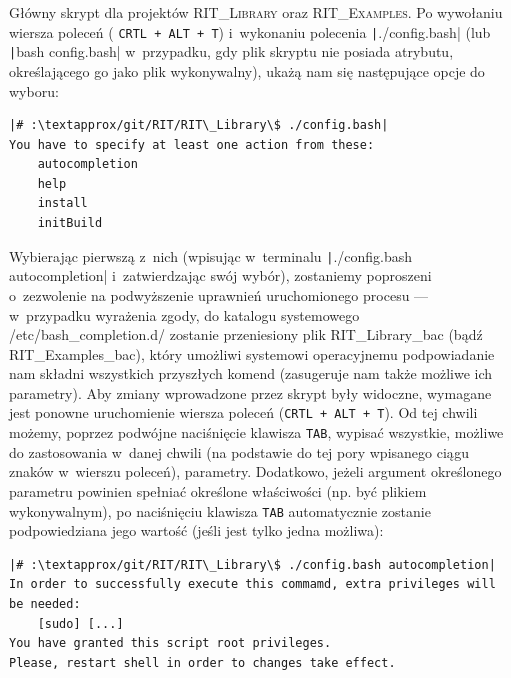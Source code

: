 
Główny skrypt dla projektów \textsc{RIT\_Library} oraz \textsc{RIT\_Examples}. Po wywołaniu wiersza poleceń ( \texttt{CRTL + ALT + T}) i~wykonaniu polecenia \texttt|./config.bash| (lub \texttt|bash config.bash| w~przypadku, gdy plik skryptu nie posiada atrybutu, określającego go jako plik wykonywalny), ukażą nam się następujące opcje do wyboru:

\begin{verbatim}
|# :\textapprox/git/RIT/RIT\_Library\$ ./config.bash|
You have to specify at least one action from these:
	autocompletion
	help
	install
	initBuild
\end{verbatim}

Wybierając pierwszą z~nich (wpisując w~terminalu \texttt|./config.bash autocompletion| i~zatwierdzając swój wybór), zostaniemy poproszeni o~zezwolenie na podwyższenie uprawnień uruchomionego procesu --- w~przypadku wyrażenia zgody, do katalogu systemowego \textsf{\textapprox/etc/bash\_completion.d/} zostanie przeniesiony plik \textsf{RIT\_Library\_bac} (bądź \textsf{RIT\_Examples\_bac}), który umożliwi systemowi operacyjnemu podpowiadanie nam składni wszystkich przyszłych komend (zasugeruje nam także możliwe ich parametry). Aby zmiany wprowadzone przez skrypt były widoczne, wymagane jest ponowne uruchomienie wiersza poleceń (\texttt{CRTL + ALT + T}). Od tej chwili możemy, poprzez podwójne naciśnięcie klawisza \texttt{TAB}, wypisać wszystkie, możliwe do zastosowania w~danej chwili (na podstawie do tej pory wpisanego ciągu znaków w~wierszu poleceń), parametry. Dodatkowo, jeżeli argument określonego parametru powinien spełniać określone właściwości (np. być plikiem wykonywalnym), po naciśnięciu klawisza \texttt{TAB} automatycznie zostanie podpowiedziana jego wartość (jeśli jest tylko jedna możliwa):

\begin{verbatim}
|# :\textapprox/git/RIT/RIT\_Library\$ ./config.bash autocompletion|
In order to successfully execute this commamd, extra privileges will be needed:
	[sudo] [...]
You have granted this script root privileges.
Please, restart shell in order to changes take effect.
\end{verbatim}

